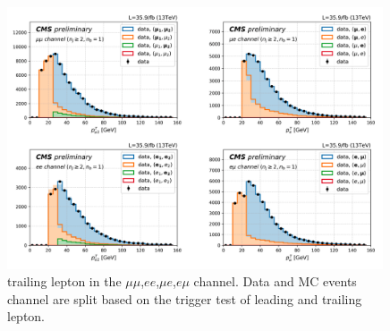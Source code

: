 \begin{figure}[h!]
  \centering
  \includegraphics[width=0.99\textwidth]{chapters/Analysis/sectionSelection/figures/trTest.png}
  \caption{trailing lepton \pt in the $\mu\mu$,$ee$,$\mu e$,$e\mu$ channel. Data and MC events channel are split 
  based on the trigger test of leading and trailing lepton.
  \label{fig:triggerTest}}
\end{figure}
\FloatBarrier






% 












\FloatBarrier


